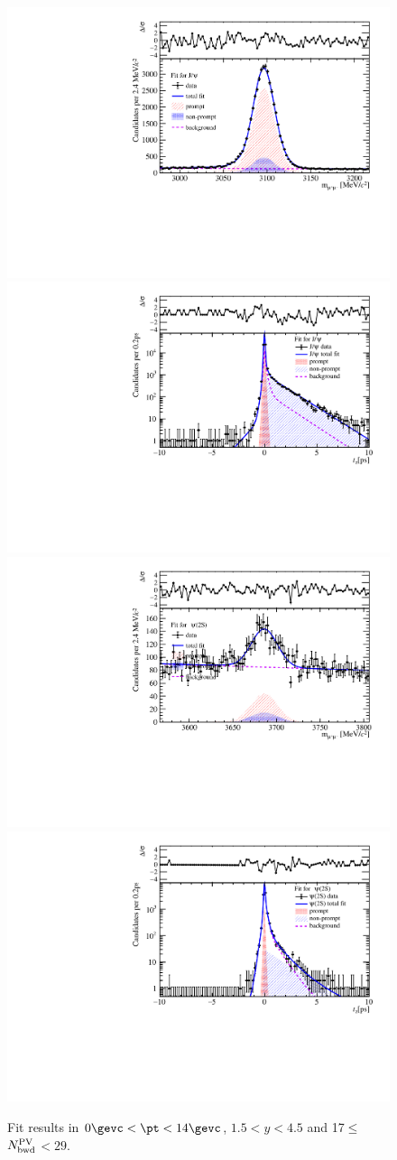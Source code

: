 \begin{figure}[H]
\begin{center}
\includegraphics[width=0.45\linewidth]{pdf/pPb/BWorkdir/TwoDimFit/ProjMass/Jpsi_n2y1pt1.pdf}
\includegraphics[width=0.45\linewidth]{pdf/pPb/BWorkdir/TwoDimFit/ProjTz/Jpsi_n2y1pt1.pdf}
\vspace*{-0.5cm}
\includegraphics[width=0.45\linewidth]{pdf/pPb/BWorkdir/TwoDimFit/ProjMass/Psi2S_n2y1pt1.pdf}
\includegraphics[width=0.45\linewidth]{pdf/pPb/BWorkdir/TwoDimFit/ProjTz/Psi2S_n2y1pt1.pdf}
\vspace*{-0.5cm}
\end{center}
\caption{Fit results in $0\gevc<\pt<14\gevc$, $1.5<y<4.5$ and 17$\leq$$N^{\rm PV}_{\rm bwd}$$<29$.}
\end{figure}
